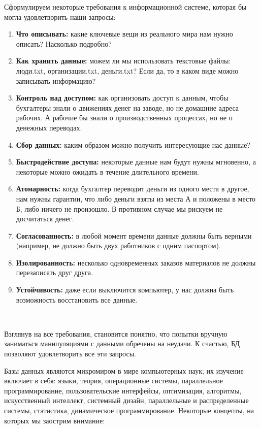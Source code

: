 Сформулируем некоторые требования к информационной системе, которая бы могла удовлетворить наши запросы: \\

\begin{enumerate}
  \item \textbf{Что описывать:} какие ключевые вещи из реального мира нам нужно описать? Насколько подробно?
  \item \textbf{Как хранить данные:} можем ли мы использовать текстовые файлы: люди.txt, организации.txt, деньги.txt? Если да, то в каком виде можно записывать информацию?
  \item \textbf{Контроль над доступом:} как организовать доступ к данным, чтобы бухгалтеры знали о движениях денег на заводе, но не домашние адреса рабочих. А рабочие бы знали о производственных процессах, но не о денежных переводах.
  \item \textbf{Сбор данных:} каким образом можно получить интересующие нас данные?
  \item \textbf{Быстродействие доступа:} некоторые данные нам будут нужны мгновенно, а некоторые можно ожидать в течение длительного времени.
  \item \textbf{Атомарность:} когда бухгалтер переводит деньги из одного места в другое, нам нужны гарантии, что либо деньги взяты из места А и положены в место Б, либо ничего не произошло. В противном случае мы рискуем не досчитаться денег.
  \item \textbf{Согласованность:} в любой момент времени данные должны быть верными (например, не должно быть двух работников с одним паспортом).
  \item \textbf{Изолированность:} несколько одновременных заказов материалов не должны перезаписать друг друга.
  \item \textbf{Устойчивость:} даже если выключится компьютер, у нас должна быть возможность восстановить все данные.
\end{enumerate}
\

Взглянув на все требования, становится понятно, что попытки вручную заниматься манипуляциями с данными обречены на неудачи. К счастью, БД позволяют удовлетворить все эти запросы.

Базы данных являются микромиром в мире компьютерных наук; их изучение включает в себя: языки, теория, операционные системы, параллельное программирование, пользовательские интерфейсы, оптимизация, алгоритмы, искусственный интеллект, системный дизайн, параллельные и распределенные системы, статистика, динамическое программирование. Некоторые концепты, на которых мы заострим внимание: \\

